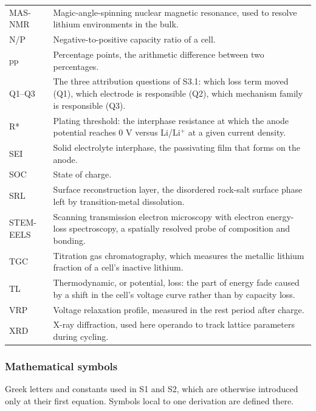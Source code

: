 \documentclass[11pt,a4paper]{article}
\begin{document}
\begin{longtable}{@{}>{\raggedright\arraybackslash}p{}>{\raggedright\arraybackslash}p{}@{}}
MAS-NMR & Magic-angle-spinning nuclear magnetic resonance, used to resolve lithium environments in the bulk. \\
N/P & Negative-to-positive capacity ratio of a cell. \\
pp & Percentage points, the arithmetic difference between two percentages. \\
Q1--Q3 & The three attribution questions of S3.1: which loss term moved (Q1), which electrode is responsible (Q2), which mechanism family is responsible (Q3). \\
R* & Plating threshold: the interphase resistance at which the anode potential reaches 0 V versus Li/Li\ensuremath{^{+}} at a given current density. \\
SEI & Solid electrolyte interphase, the passivating film that forms on the anode. \\
SOC & State of charge. \\
SRL & Surface reconstruction layer, the disordered rock-salt surface phase left by transition-metal dissolution. \\
STEM-EELS & Scanning transmission electron microscopy with electron energy-loss spectroscopy, a spatially resolved probe of composition and bonding. \\
TGC & Titration gas chromatography, which measures the metallic lithium fraction of a cell's inactive lithium. \\
TL & Thermodynamic, or potential, loss: the part of energy fade caused by a shift in the cell's voltage curve rather than by capacity loss. \\
VRP & Voltage relaxation profile, measured in the rest period after charge. \\
XRD & X-ray diffraction, used here operando to track lattice parameters during cycling. \\
\hline
\end{longtable}
\endgroup



\subsubsection*{Mathematical symbols}


Greek letters and constants used in S1 and S2, which are otherwise introduced only at their first equation. Symbols local to one derivation are defined there.
\end{document}
